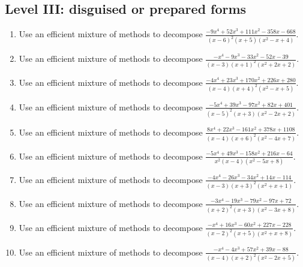 \documentclass[11pt,oneside]{book}
\begin{document}
\subsection*{Level III: disguised or prepared forms}
\begin{enumerate}[leftmargin=*,label=\textbf{\arabic*.},itemsep=0.65\baselineskip]
\item Use an efficient mixture of methods to decompose $\displaystyle \frac{- 9 x^{4} + 52 x^{3} + 111 x^{2} - 358 x - 668}{\left(x - 6\right)^{2} \left(x + 5\right) \left(x^{2} - x + 4\right)}$.
\item Use an efficient mixture of methods to decompose $\displaystyle \frac{- x^{4} - 9 x^{3} - 33 x^{2} - 52 x - 39}{\left(x - 3\right) \left(x + 1\right)^{2} \left(x^{2} + 2 x + 2\right)}$.
\item Use an efficient mixture of methods to decompose $\displaystyle \frac{- 4 x^{4} + 23 x^{3} + 170 x^{2} + 226 x + 280}{\left(x - 4\right) \left(x + 4\right)^{2} \left(x^{2} - x + 5\right)}$.
\item Use an efficient mixture of methods to decompose $\displaystyle \frac{- 5 x^{4} + 39 x^{3} - 97 x^{2} + 82 x + 401}{\left(x - 5\right)^{2} \left(x + 3\right) \left(x^{2} - 2 x + 2\right)}$.
\item Use an efficient mixture of methods to decompose $\displaystyle \frac{8 x^{4} + 22 x^{3} - 161 x^{2} + 378 x + 1108}{\left(x - 4\right) \left(x + 6\right)^{2} \left(x^{2} - 4 x + 7\right)}$.
\item Use an efficient mixture of methods to decompose $\displaystyle \frac{- 5 x^{4} + 49 x^{3} - 158 x^{2} + 216 x - 64}{x^{2} \left(x - 4\right) \left(x^{2} - 5 x + 8\right)}$.
\item Use an efficient mixture of methods to decompose $\displaystyle \frac{- 4 x^{4} - 26 x^{3} - 34 x^{2} + 14 x - 114}{\left(x - 3\right) \left(x + 3\right)^{2} \left(x^{2} + x + 1\right)}$.
\item Use an efficient mixture of methods to decompose $\displaystyle \frac{- 3 x^{4} - 19 x^{3} - 79 x^{2} - 97 x + 72}{\left(x + 2\right)^{2} \left(x + 3\right) \left(x^{2} - 3 x + 8\right)}$.
\item Use an efficient mixture of methods to decompose $\displaystyle \frac{- x^{4} + 16 x^{3} - 60 x^{2} + 227 x - 228}{\left(x - 2\right)^{2} \left(x + 5\right) \left(x^{2} + x + 8\right)}$.
\item Use an efficient mixture of methods to decompose $\displaystyle \frac{- x^{4} - 4 x^{3} + 57 x^{2} + 39 x - 88}{\left(x - 4\right) \left(x + 2\right)^{2} \left(x^{2} - 2 x + 5\right)}$.
\end{enumerate}
\end{document}
